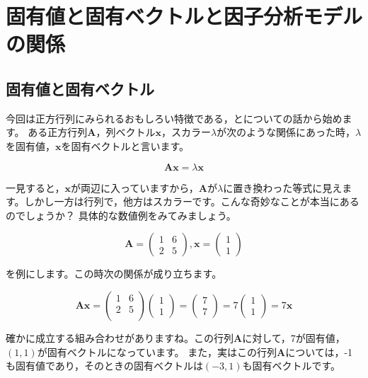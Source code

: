 \documentclass{ltjsbook}
\begin{document}
\chapter{固有値と固有ベクトルと因子分析モデルの関係}
\label{x08_eigen}

\section{固有値と固有ベクトル}
今回は正方行列にみられるおもしろい特徴である，とについての話から始めます。
ある正方行列$\bm{A}$，列ベクトル$\bm{x}$，スカラー$\lambda$が次のような関係にあった時，$\lambda$を固有値，$\bm{x}$を固有ベクトルと言います。

\[ \bm{Ax} = \lambda\bm{x} \]

一見すると，$\bm{x}$が両辺に入っていますから，$\bm{A}$が$\lambda$に置き換わった等式に見えます。しかし一方は行列で，他方はスカラーです。こんな奇妙なことが本当にあるのでしょうか？
具体的な数値例をみてみましょう。

\[
    \bm{A} = \begin{pmatrix}
        1 & 6 \\ 2 & 5
    \end{pmatrix}
    ,\bm{x} = \begin{pmatrix}
        1 \\ 1
    \end{pmatrix}
\]

を例にします。この時次の関係が成り立ちます。

\[
    \bm{Ax} =
    \begin {pmatrix}
    1 & 6 \\
    2 & 5 \\
    \end{pmatrix}
    \begin{pmatrix}
        1 \\ 1
    \end{pmatrix}
    =
    \begin{pmatrix}
        7 \\ 7
    \end{pmatrix}
    =7
    \begin{pmatrix}
        1 \\ 1
    \end{pmatrix}
    =7 \bm{x}
\]

確かに成立する組み合わせがありますね。この行列$\bm{A}$に対して，7が固有値，$(1,1)$が固有ベクトルになっています。
また，実はこの行列$\bm{A}$については，-1も固有値であり，そのときの固有ベクトルは$(-3,1)$も固有ベクトルです。
\end{document}
